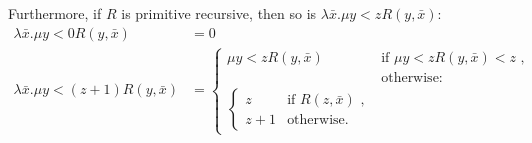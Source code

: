 \documentclass[a4paper,11pt]{article}
\begin{document}
\begin{enumerate}
Furthermore, if $R$ is primitive recursive, then so is $\lambda \bar{x}. \mu y \! < \! z R(y, \bar{x})$:
\begin{align*}
  \lambda \bar{x}. \mu y \! < \! 0 R(y, \bar{x})             &= 0\\
  \lambda \bar{x}. \mu y \! < \! (z \! + \! 1) R(y, \bar{x}) &=
  \begin{cases}
    \mu y \! < \! z R(y, \bar{x}) & \text{if $\mu y \! < \! z R(y, \bar{x}) < z$ ,}\\
                                  & \text{otherwise:}\\
    \begin{cases}
       z     & \text{if $R(z, \bar{x})$ ,}\\
       z + 1 & \text{otherwise.}
    \end{cases}
  \end{cases}
\end{align*}


\end{enumerate}
\end{document}

